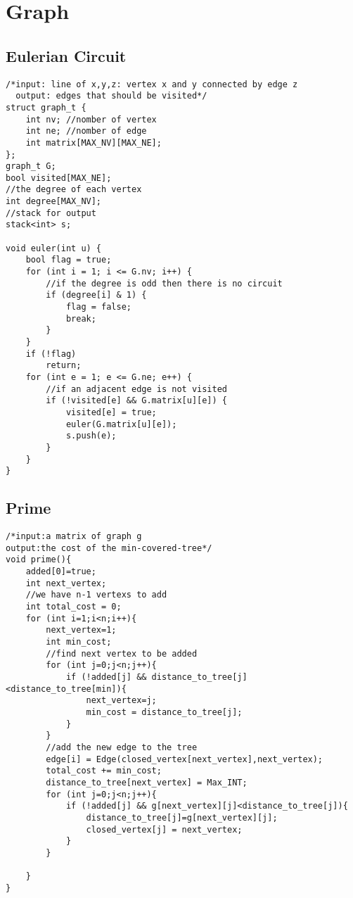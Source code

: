 \newpage
\section{Graph}

\subsection{Eulerian Circuit}
\begin{lstlisting}
/*input: line of x,y,z: vertex x and y connected by edge z
  output: edges that should be visited*/
struct graph_t {
    int nv; //nomber of vertex
    int ne; //nomber of edge
    int matrix[MAX_NV][MAX_NE];
};
graph_t G;
bool visited[MAX_NE];
//the degree of each vertex
int degree[MAX_NV];    
//stack for output
stack<int> s;

void euler(int u) {
    bool flag = true;
    for (int i = 1; i <= G.nv; i++) {
        //if the degree is odd then there is no circuit
        if (degree[i] & 1) {
            flag = false;
            break;
        }
    }
    if (!flag)
    	return;    
    for (int e = 1; e <= G.ne; e++) {
    	//if an adjacent edge is not visited
        if (!visited[e] && G.matrix[u][e]) {
            visited[e] = true;
            euler(G.matrix[u][e]);
            s.push(e);
        }
    }
}
\end{lstlisting}

\subsection{Prime}
\begin{lstlisting}
/*input:a matrix of graph g
output:the cost of the min-covered-tree*/
void prime(){
    added[0]=true;
    int next_vertex;
    //we have n-1 vertexs to add
    int total_cost = 0;
    for (int i=1;i<n;i++){
        next_vertex=1;
        int min_cost;
        //find next vertex to be added
        for (int j=0;j<n;j++){
            if (!added[j] && distance_to_tree[j]<distance_to_tree[min]){
                next_vertex=j;
                min_cost = distance_to_tree[j];
            }
        }
        //add the new edge to the tree
        edge[i] = Edge(closed_vertex[next_vertex],next_vertex);
        total_cost += min_cost; 
        distance_to_tree[next_vertex] = Max_INT;
        for (int j=0;j<n;j++){
            if (!added[j] && g[next_vertex][j]<distance_to_tree[j]){
                distance_to_tree[j]=g[next_vertex][j];
                closed_vertex[j] = next_vertex;
            }
        }

    }
}
\end{lstlisting}

